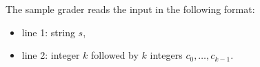 The sample grader reads the input in the following format:

\begin{itemize}
\item line 1: string $s$,
\item line 2: integer $k$ followed by $k$ integers $c_0, \ldots, c_{k - 1}$.
\end{itemize}